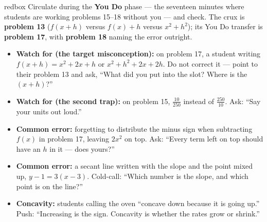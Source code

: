 \documentclass[10pt]{article}
\begin{document}
\begin{skillbox}{redbox}
Circulate during the \textbf{You Do} phase --- the seventeen minutes where students are working
problems 15--18 without you --- and check. The crux is \textbf{problem 13} ($f(x + h)$ versus
$f(x) + h$ versus $x^2 + h^2$); its You Do transfer is \textbf{problem 17}, with
\textbf{problem 18} naming the error outright.
\begin{itemize}
  \item \textbf{Watch for (the target misconception):} on problem 17, a student writing
        $f(x + h) = x^2 + 2x + h$ or $x^2 + h^2 + 2x + 2h$. Do not correct it --- point to
        their problem 13 and ask, ``What did you put into the slot? Where is the
        $(x + h)$?''
  \item \textbf{Watch for (the second trap):} on problem 15, $\frac{10}{250}$ instead of
        $\frac{250}{10}$. Ask: ``Say your units out loud.''
  \item \textbf{Common error:} forgetting to distribute the minus sign when subtracting $f(x)$
        in problem 17, leaving $2x^2$ on top. Ask: ``Every term left on top should have an
        $h$ in it --- does yours?''
  \item \textbf{Common error:} a secant line written with the slope and the point mixed up,
        $y - 1 = 3(x - 3)$. Cold-call: ``Which number is the slope, and which point is on the
        line?''
  \item \textbf{Concavity:} students calling the oven ``concave down because it is going up.''
        Push: ``Increasing is the sign. Concavity is whether the rates grow or shrink.''
\end{itemize}
\end{skillbox}
\end{document}
